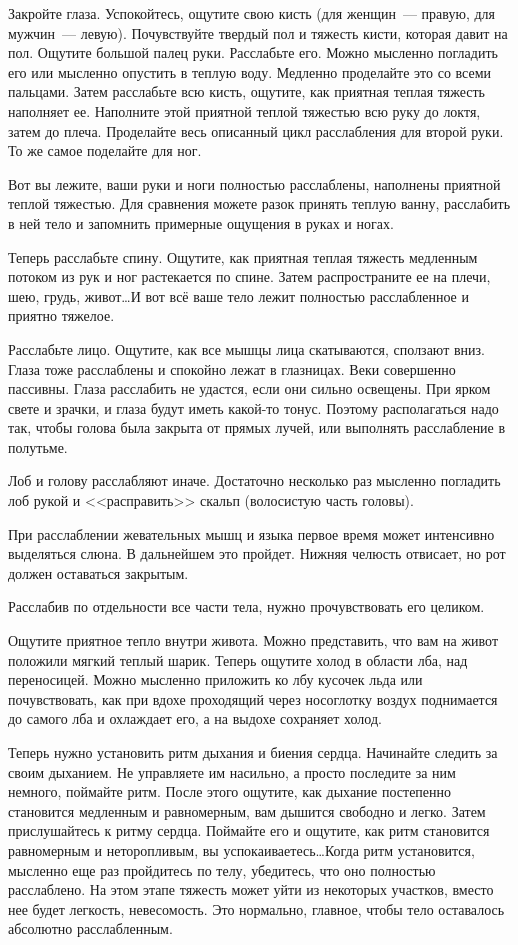\documentclass[a4paper,14pt,oneside]{memoir}
\begin{document}
Закройте глаза. Успокойтесь, ощутите свою кисть (для женщин~--- правую, для мужчин~--- левую). Почувствуйте твердый пол и тяжесть кисти, которая давит на пол. Ощутите большой палец руки. Расслабьте его. Можно мысленно погладить его или мысленно опустить в теплую воду. Медленно проделайте это со всеми пальцами. Затем расслабьте всю кисть, ощутите, как приятная теплая тяжесть наполняет ее. Наполните этой приятной теплой тяжестью всю руку до локтя, затем до плеча. Проделайте весь описанный цикл расслабления для второй руки. То же самое поделайте для ног.

Вот вы лежите, ваши руки и ноги полностью расслаблены, наполнены приятной теплой тяжестью. Для сравнения можете разок принять теплую ванну, расслабить в ней тело и запомнить примерные ощущения в руках и ногах.

Теперь расслабьте спину. Ощутите, как приятная теплая тяжесть медленным потоком из рук и ног растекается по спине. Затем распространите ее на плечи, шею, грудь, живот\ldots И вот всё ваше тело лежит полностью расслабленное и приятно тяжелое.

Расслабьте лицо. Ощутите, как все мышцы лица скатываются, сползают вниз. Глаза тоже расслаблены и спокойно лежат в глазницах. Веки совершенно пассивны. Глаза расслабить не удастся, если они сильно освещены. При ярком свете и зрачки, и глаза будут иметь какой-то тонус. Поэтому располагаться надо так, чтобы голова была закрыта от прямых лучей, или выполнять расслабление в полутьме.

Лоб и голову расслабляют иначе. Достаточно несколько раз мысленно погладить лоб рукой и <<расправить>> скальп (волосистую часть головы).

При расслаблении жевательных мышц и языка первое время может интенсивно выделяться слюна. В дальнейшем это пройдет. Нижняя челюсть отвисает, но рот должен оставаться закрытым.

Расслабив по отдельности все части тела, нужно прочувствовать его целиком.  

Ощутите приятное тепло внутри живота. Можно представить, что вам на живот положили мягкий теплый шарик. Теперь ощутите холод в области лба, над переносицей. Можно мысленно приложить ко лбу кусочек льда или почувствовать, как при вдохе проходящий через носоглотку воздух поднимается до самого лба и охлаждает его, а на выдохе сохраняет холод.

Теперь нужно установить ритм дыхания и биения сердца. Начинайте следить за своим дыханием. Не управляете им насильно, а просто последите за ним немного, поймайте ритм. После этого ощутите, как дыхание постепенно становится медленным и равномерным, вам дышится свободно и легко. Затем прислушайтесь к ритму сердца. Поймайте его и ощутите, как ритм становится равномерным и неторопливым, вы успокаиваетесь\ldots Когда ритм установится, мысленно еще раз пройдитесь по телу, убедитесь, что оно полностью расслаблено. На этом этапе тяжесть может уйти из некоторых участков, вместо нее будет легкость, невесомость. Это нормально, главное, чтобы тело оставалось абсолютно расслабленным.
\end{document}
